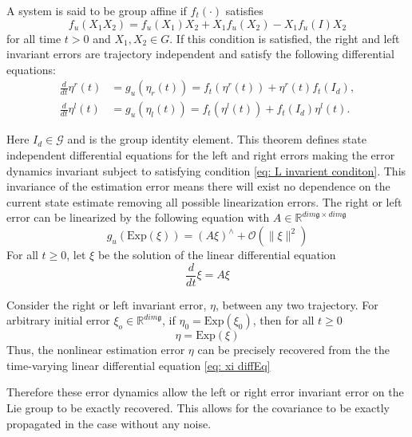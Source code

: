 \begin{theorem}
A system is said to be group affine if $f_t(\cdot)$ satisfies
\begin{equation}
    f_u(X_1 X_2) = f_u(X_1) X_2 + X_1 f_u(X_2) - X_1 f_u(I) X_2
    \label{eq: L invarient conditon}
\end{equation}
for all time $t > 0$ and $X_1, X_2 \in G$. If this condition is satisfied, the right and left invariant errors are trajectory independent and satisfy the following differential equations:
\begin{align}
    \frac{d}{dt} \eta^r(t) &= g_u(\eta_r(t)) = f_t(\eta^r(t)) + \eta^r(t) f_t(I_d), \\
    \frac{d}{dt} \eta^l(t) &= g_u(\eta_l(t)) = f_t(\eta^l(t)) + f_t(I_d) \eta^l(t).
\end{align}
\end{theorem}
Here $I_d \in \mathcal{G}$ and is the group identity element. This theorem defines state independent differential equations for the left and right errors making the error dynamics invariant subject to satisfying condition \eqref{eq: L invarient conditon}. This invariance of the estimation error means there will exist no dependence on the current state estimate removing all possible linearization errors. The right or left error can be linearized by the following equation with $A \in \mathbb{R}^{dim \mathfrak{g} \times dim \mathfrak{g}}$\cite{Contact-Aided_Invarant_EKF}
\begin{equation}
    g_u(\text{Exp}(\xi)) = (A \xi)^{\wedge} + \mathcal{O}(\|\xi\|^2)
    \label{eq: Linearization InEKF}
\end{equation}
For all $t \ge 0$, let $\xi$ be the solution of the linear differential equation \cite{Contact-Aided_Invarant_EKF}
\begin{equation}
    \frac{d}{dt} \xi = A \xi 
    \label{eq: xi diffEq}
\end{equation}
\begin{theorem}
\label{th: Log-Linear Property of Error}
Consider the right or left invariant error, $\eta$, between any two trajectory. For arbitrary initial error $\xi_o \in \mathbb{R}^{dim \mathfrak{g}}$, if $\eta_0 = \text{Exp}(\xi_0)$, then for all $t \ge 0$
\begin{equation}
    \eta = \text{Exp}(\xi)
    \label{eq: eta to exp xi}
\end{equation}
Thus, the nonlinear estimation error $\eta$ can be precisely recovered from the the time-varying linear differential equation \eqref{eq: xi diffEq}
\end{theorem}
Therefore these error dynamics allow the left or right error invariant error on the Lie group to be exactly recovered. This allows for the covariance to be exactly propagated in the case without any noise.

